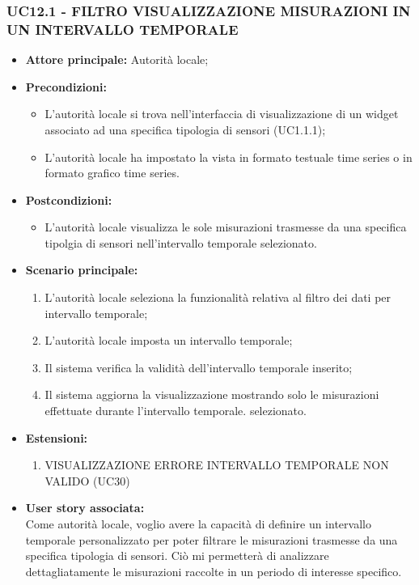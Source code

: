 \subsubsection{UC12.1 - FILTRO VISUALIZZAZIONE MISURAZIONI IN UN INTERVALLO TEMPORALE}
\begin{itemize}
    \item \textbf{Attore principale:} Autorità locale;
    \item \textbf{Precondizioni:}
        \begin{itemize}
            \item L'autorità locale si trova nell'interfaccia di visualizzazione di un widget associato ad una specifica tipologia di sensori (UC1.1.1); 
            \item L'autorità locale ha impostato la vista in formato testuale time series o in formato grafico time series.
        \end{itemize}
    \item \textbf{Postcondizioni:}
        \begin{itemize}
            \item L'autorità locale visualizza le sole misurazioni trasmesse da una specifica tipolgia di sensori nell'intervallo temporale selezionato.
        \end{itemize}
    \item \textbf{Scenario principale:}
        \begin{enumerate}
            \item L'autorità locale seleziona la funzionalità relativa al filtro dei dati per intervallo temporale;
            \item L'autorità locale imposta un intervallo temporale;
            \item Il sistema verifica la validità dell'intervallo temporale inserito;
            \item Il sistema aggiorna la visualizzazione mostrando solo le misurazioni effettuate durante l'intervallo temporale. selezionato.
        \end{enumerate}
    \item \textbf{Estensioni:}
    \begin{enumerate}
        \item VISUALIZZAZIONE ERRORE INTERVALLO TEMPORALE NON VALIDO (UC30)
    \end{enumerate}
    \item \textbf{User story associata:} \\
        Come autorità locale, voglio avere la capacità di definire un intervallo temporale personalizzato per poter filtrare le misurazioni trasmesse da una specifica tipologia di sensori. Ciò mi permetterà di analizzare dettagliatamente le misurazioni raccolte in un periodo di interesse specifico.
\end{itemize}
